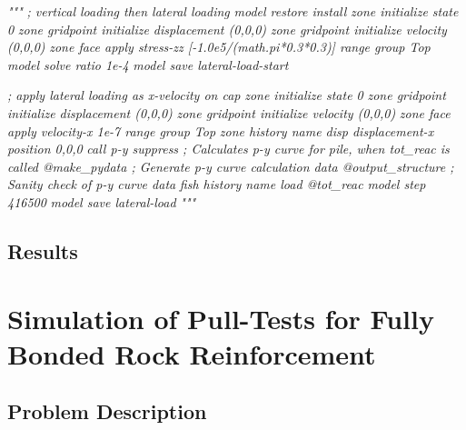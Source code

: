 \documentclass[a4paper, nobind]{templates/ociamthesis}
\newenvironment{Shaded}{\begin{snugshade}}{\end{snugshade}}
\newcommand{\CommentTok}[1]{\textcolor[rgb]{0.56,0.35,0.01}{\textit{#1}}}
\renewenvironment{Shaded}
{
  \vspace{10pt}%
  \begin{snugshade}%
}{%
  \end{snugshade}%
  \vspace{8pt}%
}
\begin{document}
\begin{Shaded}
\begin{Highlighting}[]
\CommentTok{"""}
\CommentTok{; vertical loading then lateral loading}
\CommentTok{model restore \textquotesingle{}install\textquotesingle{}}
\CommentTok{zone initialize state 0}
\CommentTok{zone gridpoint initialize displacement (0,0,0)}
\CommentTok{zone gridpoint initialize velocity     (0,0,0) }
\CommentTok{zone face apply stress{-}zz [{-}1.0e5/(math.pi*0.3*0.3)] range group \textquotesingle{}Top\textquotesingle{}}
\CommentTok{model solve ratio 1e{-}4}
\CommentTok{model save \textquotesingle{}lateral{-}load{-}start\textquotesingle{}}

\CommentTok{; apply lateral loading as x{-}velocity on cap}
\CommentTok{zone initialize state 0}
\CommentTok{zone gridpoint initialize displacement (0,0,0)}
\CommentTok{zone gridpoint initialize velocity     (0,0,0) }
\CommentTok{zone face apply velocity{-}x 1e{-}7 range group \textquotesingle{}Top\textquotesingle{}}
\CommentTok{zone history name \textquotesingle{}disp\textquotesingle{} displacement{-}x position 0,0,0}
\CommentTok{call \textquotesingle{}p{-}y\textquotesingle{} suppress ; Calculates p{-}y curve for pile, when tot\_reac is called}
\CommentTok{@make\_pydata        ; Generate p{-}y curve calculation data }
\CommentTok{@output\_structure   ; Sanity check of p{-}y curve data }
\CommentTok{fish history name \textquotesingle{}load\textquotesingle{} @tot\_reac}
\CommentTok{model step 416500}
\CommentTok{model save \textquotesingle{}lateral{-}load\textquotesingle{}}
\CommentTok{"""}
\end{Highlighting}
\end{Shaded}

\hypertarget{results-1}{%
\section{Results}\label{results-1}}

\newpage

\hypertarget{simulation-of-pull-tests-for-fully-bonded-rock-reinforcement}{%
\chapter{Simulation of Pull-Tests for Fully Bonded Rock Reinforcement}\label{simulation-of-pull-tests-for-fully-bonded-rock-reinforcement}}

\hypertarget{problem-description-2}{%
\section{Problem Description}\label{problem-description-2}}
\end{document}
